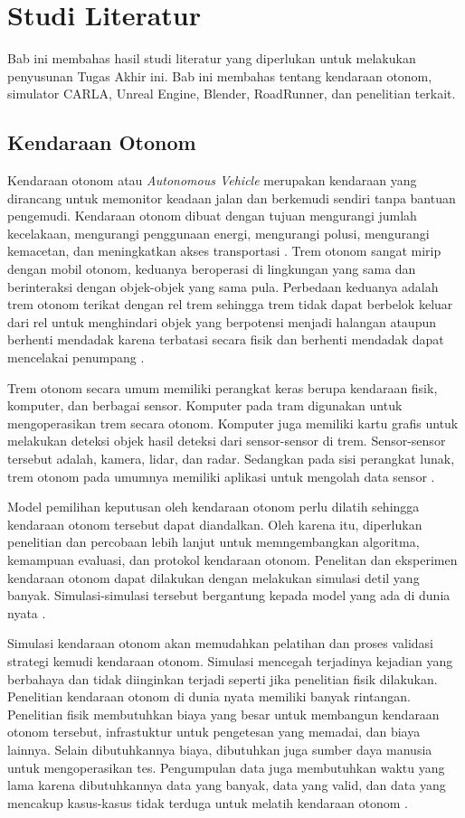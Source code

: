 \chapter{Studi Literatur}

Bab ini membahas hasil studi literatur yang diperlukan untuk melakukan
penyusunan Tugas Akhir ini. Bab ini membahas tentang kendaraan otonom, simulator
CARLA, Unreal Engine, Blender, RoadRunner, dan penelitian terkait.

\section{Kendaraan Otonom}
Kendaraan otonom atau \textit{Autonomous Vehicle} merupakan kendaraan yang
dirancang untuk memonitor keadaan jalan dan berkemudi sendiri tanpa bantuan
pengemudi. Kendaraan otonom dibuat dengan tujuan mengurangi jumlah kecelakaan,
mengurangi penggunaan energi, mengurangi polusi, mengurangi kemacetan, dan
meningkatkan akses transportasi \parencite{av-bagloee}. Trem otonom sangat mirip
dengan mobil otonom, keduanya beroperasi di lingkungan yang sama dan
berinteraksi dengan objek-objek yang sama pula. Perbedaan keduanya adalah trem
otonom terikat dengan rel trem sehingga trem tidak dapat berbelok keluar dari
rel untuk menghindari objek yang berpotensi menjadi halangan ataupun berhenti
mendadak karena terbatasi secara fisik dan berhenti mendadak dapat mencelakai
penumpang \parencite{at-palmer}.

Trem otonom secara umum memiliki perangkat keras berupa kendaraan fisik,
komputer, dan berbagai sensor. Komputer pada tram digunakan untuk mengoperasikan
trem secara otonom. Komputer juga memiliki kartu grafis untuk melakukan deteksi
objek hasil deteksi dari sensor-sensor di trem. Sensor-sensor tersebut adalah,
kamera, lidar, dan radar. Sedangkan pada sisi perangkat lunak, trem otonom pada
umumnya memiliki aplikasi untuk mengolah data sensor \parencite{at-palmer}.

Model pemilihan keputusan oleh kendaraan otonom perlu dilatih sehingga kendaraan
otonom tersebut dapat diandalkan. Oleh karena itu, diperlukan penelitian dan
percobaan lebih lanjut untuk memngembangkan algoritma, kemampuan evaluasi, dan
protokol kendaraan otonom. Penelitan dan eksperimen kendaraan otonom dapat
dilakukan dengan melakukan simulasi detil yang banyak. Simulasi-simulasi
tersebut bergantung kepada model yang ada di dunia nyata \parencite{av-berger}.

Simulasi kendaraan otonom akan memudahkan pelatihan dan proses validasi strategi
kemudi kendaraan otonom. Simulasi mencegah terjadinya kejadian yang berbahaya
dan tidak diinginkan terjadi seperti jika penelitian fisik dilakukan. Penelitian
kendaraan otonom di dunia nyata memiliki banyak rintangan. Penelitian fisik
membutuhkan biaya yang besar untuk membangun kendaraan otonom tersebut,
infrastuktur untuk pengetesan yang memadai, dan biaya lainnya. Selain
dibutuhkannya biaya, dibutuhkan juga sumber daya manusia untuk mengoperasikan
tes. Pengumpulan data juga membutuhkan waktu yang lama karena dibutuhkannya data
yang banyak, data yang valid, dan data yang mencakup kasus-kasus tidak terduga
untuk melatih kendaraan otonom \parencite{carla-dosovitskiy}.

